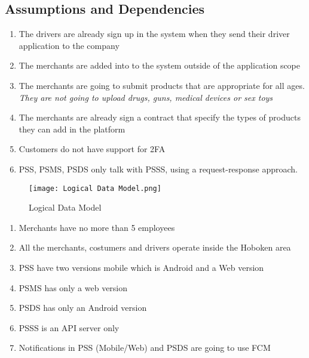 \pagebreak

\subsection{Assumptions and Dependencies}
\begin{enumerate}[label=AS-\arabic*]
    \item The drivers are already sign up in the system when they send their 
    driver application to the company
    \item The merchants are added into to the system outside of the 
    application scope
    \item The merchants are going to submit products that are appropriate for 
    all ages. \textit{They are not going to upload drugs, guns, 
    medical devices or sex toys}
    \item The merchants are already sign a contract that specify the types of 
    products they can add in the platform
    \item Customers do not have support for 2FA
    \item PSS, PSMS, PSDS only talk with PSSS, using a 
    request-response approach.
\end{enumerate}
\begin{figure}[!htb]
    \centering
    \texttt{[image: Logical Data Model.png]}
    \caption{Logical Data Model}
\end{figure}

\pagebreak

\begin{enumerate}[resume, label=AS-\arabic*]
    \item Merchants have no more than 5 employees
    \item All the merchants, costumers and drivers operate inside the 
    Hoboken area
    \item PSS have two versions mobile which is Android and a Web version
    \item PSMS has only a web version
    \item PSDS has only an Android version
    \item PSSS is an API server only
    \item Notifications in PSS (Mobile/Web) and PSDS are going to use FCM
\end{enumerate}

\pagebreak

